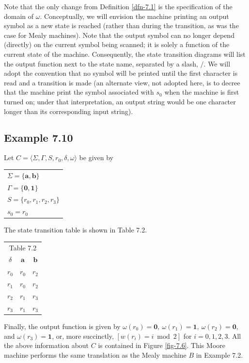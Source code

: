 Note that the only change from Definition \ref{dfn-7.1} is the specification of the
domain of $\omega$. Conceptually, we will envision the machine printing an
output symbol as a new state is reached (rather than during the transition, as
was the case for Mealy machines). Note that the output symbol can no longer
depend (directly) on the current symbol being scanned; it is solely a function
of the current state of the machine. Consequently, the state transition diagrams
will list the output function next to the state name, separated by a slash, $/$.
We will adopt the convention that no symbol will be printed until the first
character is read and a transition is made (an alternate view, not adopted here,
is to decree that the machine print the symbol associated with $s_0$ when the
machine is first turned on; under that interpretation, an output string would be one
character longer than its corresponding input string).

\subsection*{Example 7.10}

Let $C=\langle\Sigma,\Gamma,S,r_0,\delta,\omega\rangle$ be given by
\begin{center}\begin{tabular}{l}
$\Sigma=\{\pmb{a},\pmb{b}\}$ \\
$\Gamma=\{\pmb{0},\pmb{1}\}$ \\
$S=\{r_0,r_1,r_2,r_3\}$ \\
$s_0 = r_0$
\end{tabular}\end{center}
The state transition table is shown in Table 7.2.
\begin{table}[h]\label{tbl-7.2}
\begin{center}\begin{tabular}{c|cc}
\multicolumn{3}{c}{Table 7.2} \\
$\delta$ & $\pmb{a}$ & $\pmb{b}$ \\
\hline
$r_0$ & $r_0$ & $r_2$ \\
$r_1$ & $r_0$ & $r_2$ \\
$r_2$ & $r_1$ & $r_3$ \\
$r_3$ & $r_1$ & $r_3$
\end{tabular}\end{center}
\end{table}
Finally, the output function is given by $\omega(r_0)=\pmb{0},\ \omega(r_1)=
\pmb{1},\ \omega(r_2)=\pmb{0}$, and $\omega(r_3)=\pmb{1}$, or, more succinctly,
$[w(r_i) = i \bmod{2}]$ for $i=0,1,2,3$. All the above information about $C$ is
contained in Figure \ref{fig-7.6}. This Moore machine performs the same translation as the
Mealy machine $B$ in Example 7.2.

